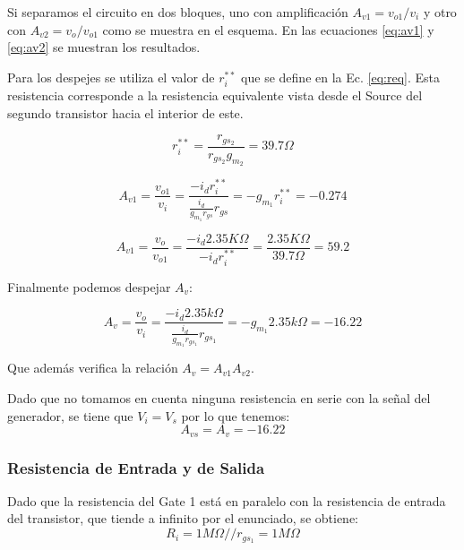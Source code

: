 \documentclass[a4paper, 10pt, spanish]{article}
\begin{document}
Si separamos el circuito en dos bloques, uno con amplificación $A_{v1}=v_{o1}/v_i$ y otro con $A_{v2}=v_o/v_{o1}$ como se muestra en el esquema. En las ecuaciones \ref{eq:av1} y \ref{eq:av2} se muestran los resultados.

Para los despejes se utiliza el valor de $r_i^{**}$ que se define en la Ec. \ref{eq:req}. Esta resistencia corresponde a la resistencia equivalente vista desde el Source del segundo transistor hacia el interior de este.

\begin{equation}
  r_i^{**}=\frac{r_{gs_2}}{r_{gs_2} g_{m_2}} = 39.7 \Omega
  \label{eq:req}
\end{equation}

\begin{equation}
  A_{v1}=\frac{v_{o1}}{v_i}=\frac{-i_d r_i^{**}}{\frac{i_d}{g_{m_1} r_{gs}}r_{gs}}=-g_{m_1} r_i^{**} = -0.274
  \label{eq:av1}
\end{equation}

\begin{equation}
  A_{v1}=\frac{v_{o}}{v_{o1}}=\frac{-i_d 2.35K\Omega}{-i_d r_i^{**}}=\frac{2.35K\Omega}{39.7\Omega} = 59.2
  \label{eq:av2}
\end{equation}

Finalmente podemos despejar $A_v$:

\begin{equation}
  A_v=\frac{v_o}{v_i}=\frac{-i_d 2.35k\Omega}{\frac{i_d}{ g_{m_1} r_{gs_1} } r_{gs_1} } = -g_{m_1} 2.35k\Omega = -16.22
  \label{eq:av}
\end{equation}

Que además verifica la relación $A_v = A_{v1} A_{v2}$.

Dado que no tomamos en cuenta ninguna resistencia en serie con la señal del generador, se tiene que $V_i=V_s$ por lo que tenemos:
\begin{equation}
  A_{vs}=A_{v}=-16.22
\end{equation}

\subsubsection{Resistencia de Entrada y de Salida}
Dado que la resistencia del Gate 1 está en paralelo con la resistencia de entrada del transistor, que tiende a infinito por el enunciado, se obtiene:
\begin{equation}
  R_i=1M\Omega // r_{gs_1} = 1M\Omega
\end{equation}
\end{document}
